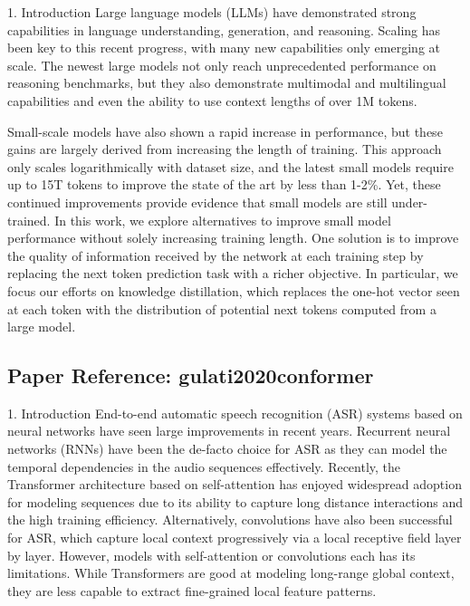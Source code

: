\documentclass[11pt,a4paper]{article}
\begin{document}
1. Introduction Large language models (LLMs) have demonstrated strong capabilities in language understanding, generation, and reasoning. Scaling has been key to this recent progress, with many new capabilities only emerging at scale. The newest large models not only reach unprecedented performance on reasoning benchmarks, but they also demonstrate multimodal and multilingual capabilities and even the ability to use context lengths of over 1M tokens.

Small-scale models have also shown a rapid increase in performance, but these gains are largely derived from increasing the length of training. This approach only scales logarithmically with dataset size, and the latest small models require up to 15T tokens to improve the state of the art by less than 1-2\%. Yet, these continued improvements provide evidence that small models are still under-trained. In this work, we explore alternatives to improve small model performance without solely increasing training length. One solution is to improve the quality of information received by the network at each training step by replacing the next token prediction task with a richer objective. In particular, we focus our efforts on knowledge distillation, which replaces the one-hot vector seen at each token with the distribution of potential next tokens computed from a large model.

\vspace{18pt}


\subsection*{Paper Reference: gulati2020conformer}

1. Introduction End-to-end automatic speech recognition (ASR) systems based on neural networks have seen large improvements in recent years. Recurrent neural networks (RNNs) have been the de-facto choice for ASR as they can model the temporal dependencies in the audio sequences effectively. Recently, the Transformer architecture based on self-attention has enjoyed widespread adoption for modeling sequences due to its ability to capture long distance interactions and the high training efficiency. Alternatively, convolutions have also been successful for ASR, which capture local context progressively via a local receptive field layer by layer. However, models with self-attention or convolutions each has its limitations. While Transformers are good at modeling long-range global context, they are less capable to extract fine-grained local feature patterns.
\end{document}
